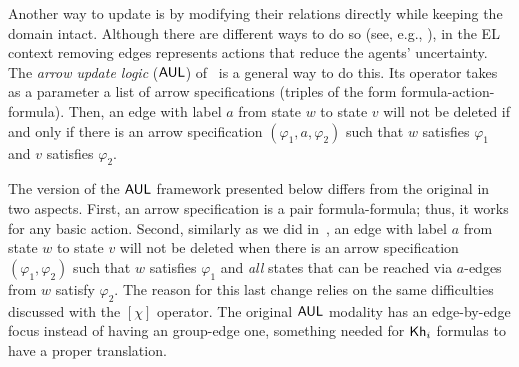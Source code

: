 Another way to update \ltss is by modifying their relations directly while keeping the domain intact. Although there are different ways to do so (see, e.g., \cite{ArecesFH15}), in the EL context 
removing edges represents actions that reduce the agents' uncertainty. The \emph{arrow update logic} ($\mathsf{AUL}$) of~\cite{KooiR11} is a general way to do this. Its operator takes as a parameter a list of arrow specifications (triples of the form formula-action-formula). Then, an edge with label $a$ from state $w$ to state $v$ will not be deleted if and only if there is an arrow specification $(\varphi_1, a, \varphi_2)$ such that $w$ satisfies $\varphi_1$ and $v$ satisfies $\varphi_2$. 

The version of the $\mathsf{AUL}$ framework presented below differs from the original in two aspects. First, an arrow specification is a pair formula-formula; thus, it works for any basic action. Second, similarly as we did in~, an edge with label $a$ from state $w$ to state $v$ will not be deleted when there is an arrow specification $(\varphi_1, \varphi_2)$ such that $w$ satisfies $\varphi_1$ and \emph{all} states that can be reached via $a$-edges from $w$ satisfy $\varphi_2$.
The reason for this last change relies on the same difficulties discussed with the $[\chi]$ operator. The original $\mathsf{AUL}$ modality has an edge-by-edge focus instead of having an group-edge one, something needed for ${\sf Kh}_i$ formulas to have a proper translation. 


